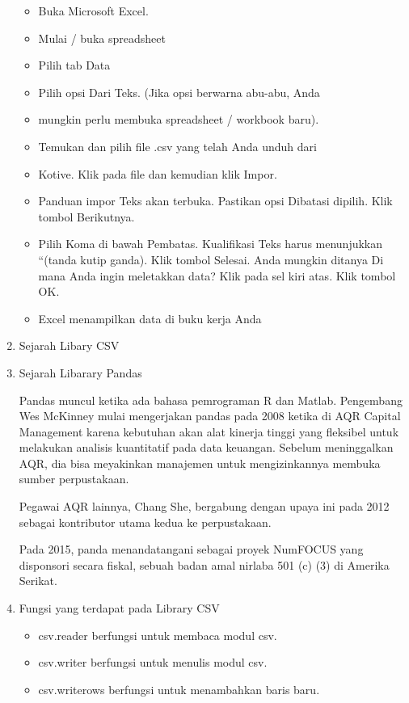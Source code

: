 \begin{enumerate}
\begin{itemize}
\item Buka Microsoft Excel.
\item Mulai / buka spreadsheet 
\item Pilih tab Data 
\item Pilih opsi Dari Teks. (Jika opsi berwarna abu-abu, Anda \item mungkin perlu membuka spreadsheet / workbook baru).
\item Temukan dan pilih file .csv yang telah Anda unduh dari \item Kotive. Klik pada file dan kemudian klik Impor.
\item Panduan impor Teks akan terbuka. Pastikan opsi Dibatasi  dipilih. Klik tombol Berikutnya.
\item Pilih Koma di bawah Pembatas. Kualifikasi Teks harus menunjukkan “(tanda kutip ganda). Klik tombol Selesai.
Anda mungkin ditanya Di mana Anda ingin meletakkan data? Klik pada sel kiri atas. Klik tombol OK.
\item Excel menampilkan data di buku kerja Anda
\end{itemize}



\item Sejarah Libary CSV


\item Sejarah Libarary Pandas

Pandas muncul ketika ada bahasa pemrograman R dan Matlab.
Pengembang Wes McKinney mulai mengerjakan pandas pada 2008 ketika di AQR Capital Management karena kebutuhan akan alat kinerja tinggi yang fleksibel untuk melakukan analisis kuantitatif pada data keuangan. Sebelum meninggalkan AQR, dia bisa meyakinkan manajemen untuk mengizinkannya membuka sumber perpustakaan.

Pegawai AQR lainnya, Chang She, bergabung dengan upaya ini pada 2012 sebagai kontributor utama kedua ke perpustakaan.

Pada 2015, panda menandatangani sebagai proyek NumFOCUS yang disponsori secara fiskal, sebuah badan amal nirlaba 501 (c) (3) di Amerika Serikat.

\item Fungsi yang terdapat pada Library CSV

\begin{itemize}
\item csv.reader berfungsi untuk membaca modul csv.
\item csv.writer berfungsi untuk menulis modul csv.
\item csv.writerows berfungsi untuk menambahkan baris baru.
\end{itemize}


\end{enumerate}

